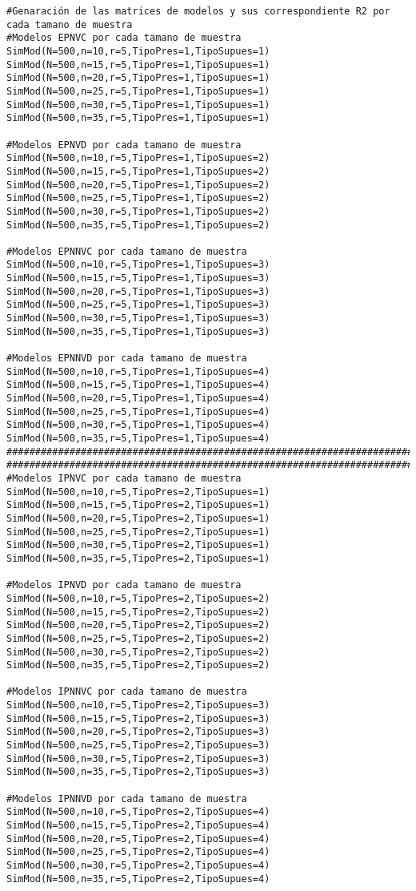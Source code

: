\begin{verbatim}
#Genaración de las matrices de modelos y sus correspondiente R2 por cada tamano de muestra
#Modelos EPNVC por cada tamano de muestra
SimMod(N=500,n=10,r=5,TipoPres=1,TipoSupues=1)
SimMod(N=500,n=15,r=5,TipoPres=1,TipoSupues=1)
SimMod(N=500,n=20,r=5,TipoPres=1,TipoSupues=1)
SimMod(N=500,n=25,r=5,TipoPres=1,TipoSupues=1)
SimMod(N=500,n=30,r=5,TipoPres=1,TipoSupues=1)
SimMod(N=500,n=35,r=5,TipoPres=1,TipoSupues=1)

#Modelos EPNVD por cada tamano de muestra
SimMod(N=500,n=10,r=5,TipoPres=1,TipoSupues=2)
SimMod(N=500,n=15,r=5,TipoPres=1,TipoSupues=2)
SimMod(N=500,n=20,r=5,TipoPres=1,TipoSupues=2)
SimMod(N=500,n=25,r=5,TipoPres=1,TipoSupues=2)
SimMod(N=500,n=30,r=5,TipoPres=1,TipoSupues=2)
SimMod(N=500,n=35,r=5,TipoPres=1,TipoSupues=2)

#Modelos EPNNVC por cada tamano de muestra
SimMod(N=500,n=10,r=5,TipoPres=1,TipoSupues=3)
SimMod(N=500,n=15,r=5,TipoPres=1,TipoSupues=3)
SimMod(N=500,n=20,r=5,TipoPres=1,TipoSupues=3)
SimMod(N=500,n=25,r=5,TipoPres=1,TipoSupues=3)
SimMod(N=500,n=30,r=5,TipoPres=1,TipoSupues=3)
SimMod(N=500,n=35,r=5,TipoPres=1,TipoSupues=3)

#Modelos EPNNVD por cada tamano de muestra
SimMod(N=500,n=10,r=5,TipoPres=1,TipoSupues=4)
SimMod(N=500,n=15,r=5,TipoPres=1,TipoSupues=4)
SimMod(N=500,n=20,r=5,TipoPres=1,TipoSupues=4)
SimMod(N=500,n=25,r=5,TipoPres=1,TipoSupues=4)
SimMod(N=500,n=30,r=5,TipoPres=1,TipoSupues=4)
SimMod(N=500,n=35,r=5,TipoPres=1,TipoSupues=4)
################################################################################
################################################################################
#Modelos IPNVC por cada tamano de muestra
SimMod(N=500,n=10,r=5,TipoPres=2,TipoSupues=1)
SimMod(N=500,n=15,r=5,TipoPres=2,TipoSupues=1)
SimMod(N=500,n=20,r=5,TipoPres=2,TipoSupues=1)
SimMod(N=500,n=25,r=5,TipoPres=2,TipoSupues=1)
SimMod(N=500,n=30,r=5,TipoPres=2,TipoSupues=1)
SimMod(N=500,n=35,r=5,TipoPres=2,TipoSupues=1)

#Modelos IPNVD por cada tamano de muestra
SimMod(N=500,n=10,r=5,TipoPres=2,TipoSupues=2)
SimMod(N=500,n=15,r=5,TipoPres=2,TipoSupues=2)
SimMod(N=500,n=20,r=5,TipoPres=2,TipoSupues=2)
SimMod(N=500,n=25,r=5,TipoPres=2,TipoSupues=2)
SimMod(N=500,n=30,r=5,TipoPres=2,TipoSupues=2)
SimMod(N=500,n=35,r=5,TipoPres=2,TipoSupues=2)

#Modelos IPNNVC por cada tamano de muestra
SimMod(N=500,n=10,r=5,TipoPres=2,TipoSupues=3)
SimMod(N=500,n=15,r=5,TipoPres=2,TipoSupues=3)
SimMod(N=500,n=20,r=5,TipoPres=2,TipoSupues=3)
SimMod(N=500,n=25,r=5,TipoPres=2,TipoSupues=3)
SimMod(N=500,n=30,r=5,TipoPres=2,TipoSupues=3)
SimMod(N=500,n=35,r=5,TipoPres=2,TipoSupues=3)

#Modelos IPNNVD por cada tamano de muestra
SimMod(N=500,n=10,r=5,TipoPres=2,TipoSupues=4)
SimMod(N=500,n=15,r=5,TipoPres=2,TipoSupues=4)
SimMod(N=500,n=20,r=5,TipoPres=2,TipoSupues=4)
SimMod(N=500,n=25,r=5,TipoPres=2,TipoSupues=4)
SimMod(N=500,n=30,r=5,TipoPres=2,TipoSupues=4)
SimMod(N=500,n=35,r=5,TipoPres=2,TipoSupues=4)
\end{verbatim}